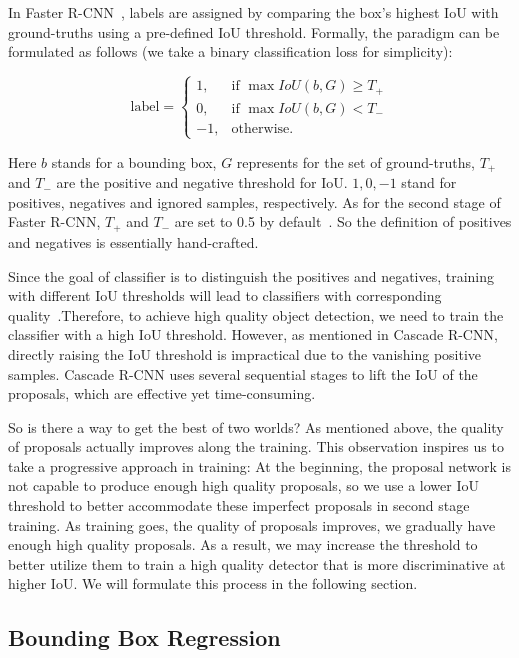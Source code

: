 \documentclass[runningheads]{llncs}
\begin{document}
In Faster R-CNN~\cite{FasterRCNN}, labels are assigned by comparing the box's highest IoU with ground-truths using a pre-defined IoU threshold. Formally, the paradigm can be formulated as follows (we take a binary classification loss for simplicity):

\begin{equation}
    \text{label} =
    \begin{cases}
        1, & \mbox{if } \max IoU(b, G) \geq T_+ \\
        0, & \mbox{if } \max IoU(b, G) < T_- \\
        -1, & \mbox{otherwise}.
    \end{cases}
    \label{eq:label_assign}
\end{equation}

Here $b$ stands for a bounding box, $G$ represents for the set of ground-truths, $T_+$ and $T_-$ are the positive and negative threshold for IoU. $1, 0, -1$ stand for positives, negatives and ignored samples, respectively. As for the second stage of Faster R-CNN, $T_+$ and $T_-$ are set to 0.5 by default~\cite{Detectron2018}. So the definition of positives and negatives is essentially hand-crafted.

Since the goal of classifier is to distinguish the positives and negatives, training with different IoU thresholds will lead to classifiers with corresponding quality~\cite{CascadeRCNN}.Therefore, to achieve high quality object detection, we need to train the classifier with a high IoU threshold. However, as mentioned in Cascade R-CNN, directly raising the IoU threshold is impractical due to the vanishing positive samples. Cascade R-CNN uses several sequential stages to lift the IoU of the proposals, which are effective yet time-consuming.

So is there a way to get the best of two worlds? As mentioned above, the quality of proposals actually improves along the training. This observation inspires us to take a progressive approach in training: At the beginning, the proposal network is not capable to produce enough high quality proposals, so we use a lower IoU threshold to better accommodate these imperfect proposals in second stage training. As training goes, the quality of proposals improves, we gradually have enough high quality proposals. As a result, we may increase the threshold to better utilize them to train a high quality detector that is more discriminative at higher IoU. We will formulate this process in the following section.


\subsection{Bounding Box Regression}
\label{sec:analysis_reg}
\end{document}
